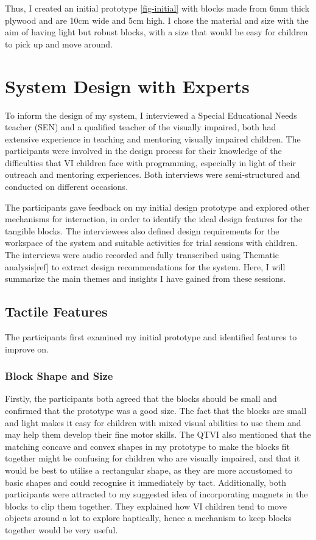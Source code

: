 \documentclass[oneside,%
                    author={Malak Hajji},
                    degree={BSc},
                    title={Designing An Accessible Computational Toolkit For Students},
                  subtitle={With Mixed Visual Abilities}]{dissertation}
\begin{document}
Thus, I created an initial prototype \ref{fig-initial} with blocks made from 6mm thick plywood and are 10cm wide and 5cm high. I chose the material and size with the aim of having light but robust blocks, with a size that would be easy for children to pick up and move around.


\section{System Design with Experts}
To inform the design of my system, I interviewed a Special Educational Needs teacher (SEN) and a qualified teacher of the visually impaired, both had extensive experience in teaching and mentoring visually impaired children. The participants were involved in the design process for their knowledge of the difficulties that VI children face with programming, especially in light of their outreach and mentoring experiences. Both interviews were semi-structured and conducted on different occasions. 

The participants gave feedback on my initial design prototype and explored other mechanisms for interaction, in order to identify the ideal design features for the tangible blocks. The interviewees also defined design requirements for the workspace of the system and suitable activities for trial sessions with children. 
The interviews were audio recorded and fully transcribed using Thematic analysis[ref] to extract design recommendations for the system. Here, I will summarize the main themes and insights I have gained from these sessions.

\subsection{Tactile Features}
The participants first examined my initial prototype and identified features to improve on.
\subsubsection{Block Shape and Size}
Firstly, the participants both agreed that the blocks should be small and confirmed that the prototype was a good size. The fact that the blocks are small and light makes it easy for  children with mixed visual abilities to use them and may help them develop their fine motor skills. The QTVI also mentioned that the  matching concave and convex shapes in my prototype to make the blocks fit together might be confusing for children who are visually impaired, and that it would be best to utilise a rectangular shape, as they are more accustomed to basic shapes and could recognise it immediately by tact. Additionally, both participants were attracted to my suggested idea of incorporating magnets in the blocks to clip them together. They explained how VI children tend to move objects around a lot to explore haptically, hence a mechanism to keep blocks together would be very useful.
\end{document}
